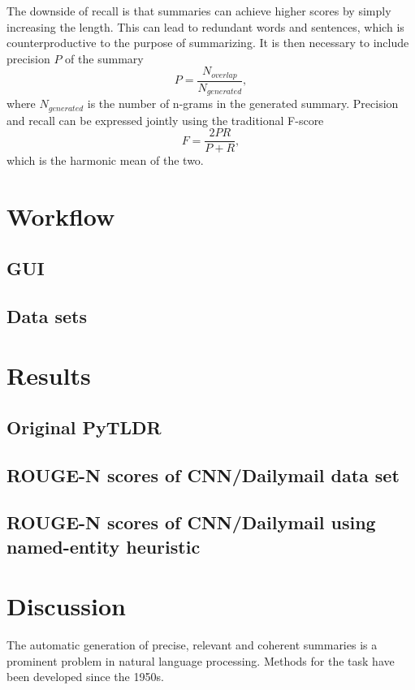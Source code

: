 \documentclass[conference]{IEEEtran}
\begin{document}
The downside of recall is that summaries can achieve higher scores by simply increasing the length. This can lead to redundant words and sentences, which is counterproductive to the purpose of summarizing. It is then necessary to include precision $P$ of the summary
\begin{equation}
P = \frac{N_{overlap}}{N_{generated}},
\end{equation}
where $N_{generated}$ is the number of n-grams in the generated summary. Precision and recall can be expressed jointly using the traditional F-score
\begin{equation}
F = \frac{2PR}{P + R},
\end{equation}
which is the harmonic mean of the two.

\section{Workflow}\label{implementation} %
\subsection{GUI}

\subsection{Data sets}\label{data}


\section{Results}\label{results}

\subsection{Original PyTLDR}
\subsection{ROUGE-N scores of CNN/Dailymail data set}
\subsection{ROUGE-N scores of CNN/Dailymail using named-entity heuristic}

\section{Discussion}\label{discussion}
The automatic generation of precise, relevant and coherent summaries is a prominent problem in natural language processing. Methods for the task have been developed since the 1950s. 
\end{document}
